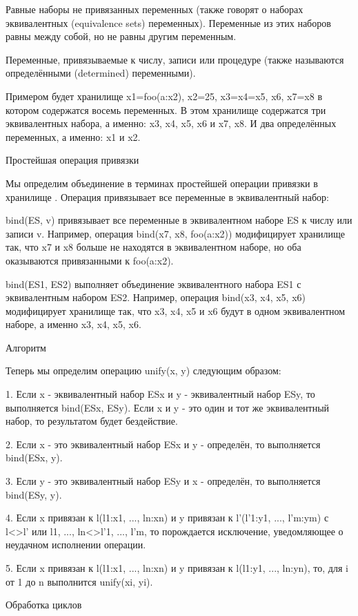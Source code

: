 Равные наборы не привязанных переменных (также говорят о наборах эквивалентных (equivalence sets) переменных). Переменные из этих наборов равны между собой, но не равны другим переменным.

Переменные, привязываемые к числу, записи или процедуре (также называются определёнными (determined) переменными).

Примером будет хранилище {x1=foo(a:x2), x2=25, x3=x4=x5, x6, x7=x8} в котором содержатся восемь переменных. В этом хранилище содержатся три эквивалентных набора, а именно: {x3, x4, x5}, {x6} и {x7, x8}. И два определённых переменных, а именно: x1 и x2.

Простейшая операция привязки

Мы определим объединение в терминах простейшей операции привязки в хранилище . Операция привязывает все переменные в эквивалентный набор:

bind(ES, v) привязывает все переменные в эквивалентном наборе ES к числу или записи v. Например, операция bind({x7, x8}, foo(a:x2)) модифицирует хранилище так, что x7 и x8 больше не находятся в эквивалентном наборе, но оба оказываются привязанными к foo(a:x2).

bind(ES1, ES2) выполняет объединение эквивалентного набора ES1 с эквивалентным набором ES2. Например, операция bind({x3, x4, x5}, {x6}) модифицирует хранилище так, что x3, x4, x5 и x6 будут в одном эквивалентном наборе, а именно {x3, x4, x5, x6}.

Алгоритм

Теперь мы определим операцию unify(x, y) следующим образом:

1. Если x - эквивалентный набор ESx и y - эквивалентный набор ESy, то выполняется bind(ESx, ESy). Если x и y - это один и тот же эквивалентный набор, то результатом будет бездействие.

2. Если x - это эквивалентный набор ESx и y - определён, то выполняется bind(ESx, y).

3. Если y - это эквивалентный набор ESy и x - определён, то выполняется bind(ESy, y).

4. Если x привязан к l(l1:x1, ..., ln:xn) и y привязан к l'(l'1:y1, ..., l'm:ym) с l<>l' или {l1, ..., ln}<>{l'1, ..., l'm}, то порождается исключение, уведомляющее о неудачном исполнении операции.

5. Если x привязан к l(l1:x1, ..., ln:xn) и y привязан к l(l1:y1, ..., ln:yn), то, для i от 1 до n выполнится unify(xi, yi).

Обработка циклов

